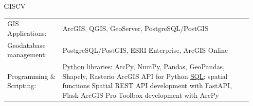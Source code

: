\documentclass[letterpaper]{article}
\newenvironment{skillslist}
        {
            \hspace*{-0.07in}\begin{tabular}[t]{ l L{5.17in} }
        }{
            \end{tabular}
        }
\newcommand{\impt}[1]{\uline{#1}}
\begin{document}
    \begin{taggedblock}{GISCV}
        \begin{skillslist}
            GIS Applications:&
                ArcGIS, QGIS, GeoServer, PostgreSQL/PostGIS \linebreak
                \\
            Geodatabase management:&
                PostgreSQL/PostGIS, ESRI Enterprise, ArcGIS Online \linebreak
                \\
            Programming \& Scripting:&
                \impt{Python} libraries: ArcPy, NumPy, Pandas, GeoPandas, Shapely, Rasterio \linebreak
                ArcGIS API for Python \linebreak
                \impt{SQL}: spatial functions \linebreak
                Spatial REST API development with FastAPI, Flask \linebreak
                ArcGIS Pro Toolbox development with ArcPy \linebreak

\end{skillslist}
\end{taggedblock}
\end{document}
